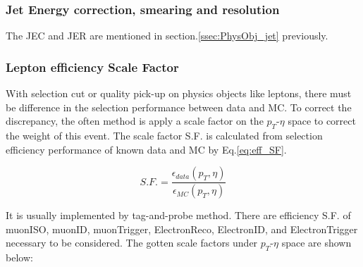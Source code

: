 		\subsubsection{Jet Energy correction, smearing and resolution}
		\label{sssec:DataAndMC_JE_CSR}

			The JEC and JER are mentioned in section.\ref{ssec:PhysObj_jet} previously.

		\subsubsection{Lepton efficiency Scale Factor}
		\label{sssec:DataAndMC_LepEffSF}

		With selection cut or quality pick-up on physics objects like leptons, there must be difference in the selection performance between data and MC. To correct the discrepancy, the often method is apply a scale factor on the $p_T$-$\eta$ space to correct the weight of this event. The scale factor S.F. is calculated from selection efficiency performance of known data and MC by Eq.\ref{eq:eff_SF}. 

		\begin{equation}
		S.F. = \frac{\epsilon_{data}(p_T,\eta)}{\epsilon_{MC}(p_T,\eta)}
		\label{eq:eff_SF}
		\end{equation}

		It is usually implemented by tag-and-probe method\cite{tagandprobe_twiki}. There are efficiency S.F. of muonISO, muonID, muonTrigger, ElectronReco, ElectronID, and ElectronTrigger necessary to be considered. The gotten scale factors under $p_T$-$\eta$ space are shown below:

